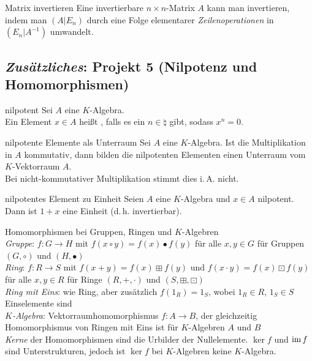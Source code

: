 \begin{Prozedur}{Matrix invertieren}
    Eine invertierbare $n \times n$-Matrix $A$ kann man invertieren, indem man
    $(A | E_n)$ durch eine Folge elementarer \emph{Zeilenoperationen} in
    $(E_n | A^{-1})$ umwandelt.
\end{Prozedur}

\subsection{%
    \emph{Zusätzliches}: Projekt 5 (Nilpotenz und Homomorphismen)%
}

\begin{Def}{nilpotent}
    Sei $A$ eine $K$-Algebra. \\
    Ein Element $x \in A$ heißt , falls
    es ein $n \in \natural$ gibt, sodass $x^n = 0$.
\end{Def}

\begin{Satz}{nilpotente Elemente als Unterraum}
    Sei $A$ eine $K$-Algebra.
    Ist die Multiplikation in $A$ kommutativ, dann bilden die
    nilpotenten Elementen einen Unterraum vom $K$-Vektorraum $A$. \\
    Bei nicht-kommutativer Multiplikation stimmt dies i.\,A. nicht.
\end{Satz}

\begin{Satz}{nilpotentes Element zu Einheit}
    Seien $A$ eine $K$-Algebra und $x \in A$ nilpotent. \\
    Dann ist $1 + x$ eine Einheit (d.\,h. invertierbar).
\end{Satz}

\begin{Def}{Homomorphismen bei Gruppen, Ringen und
            $K$-Algebren} \\
    \emph{Gruppe}: $f: G \rightarrow H$ mit
    $f(x \circ y) = f(x) \bullet f(y)$ für alle $x, y \in G$ für Gruppen
    $(G, \circ)$ und $(H, \bullet)$ \\
    \emph{Ring}: $f: R \rightarrow S$ mit
    $f(x + y) = f(x) \boxplus f(y)$ und $f(x \cdot y) = f(x) \boxdot f(y)$
    für alle $x, y \in R$ für Ringe
    $(R, \boldsymbol{+}, \boldsymbol{\cdot})$ und $(S, \boxplus, \boxdot)$ \\
    \emph{Ring mit Eins}: wie Ring, aber zusätzlich $f(1_R) = 1_S$, wobei
    $1_R \in R$, $1_S \in S$ Einselemente sind \\
    \emph{$K$-Algebra}: Vektorraumhomomorphismus $f: A \rightarrow B$, der
    gleichzeitig Homomorphismus von Ringen mit Eins ist für $K$-Algebren $A$
    und $B$ \\
    \emph{Kerne} der Homomorphismen sind die Urbilder der Nullelemente.
    $\ker f$ und $\operatorname{im} f$ sind Unterstrukturen, jedoch ist $\ker f$ bei
    $K$-Algebren keine $K$-Algebra.
\end{Def}
